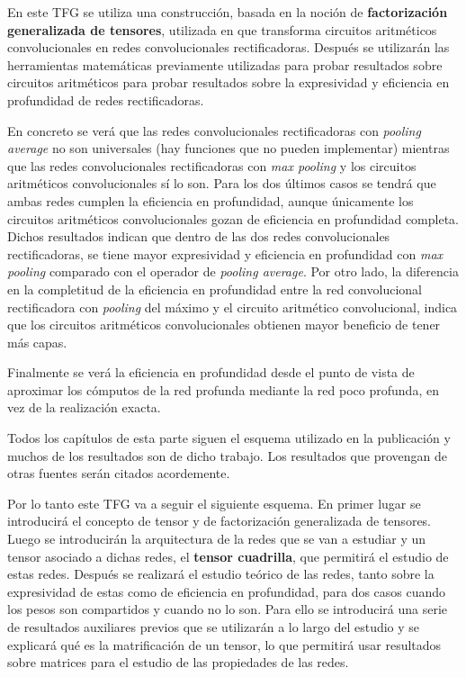 En este TFG se utiliza una construcción, basada en la noción de \textbf{factorización generalizada de tensores}, utilizada en \cite{DBLP:journals/corr/CohenSS15a} que transforma circuitos aritméticos convolucionales en redes convolucionales rectificadoras. Después se utilizarán las herramientas matemáticas previamente utilizadas para probar resultados sobre circuitos aritméticos para probar resultados sobre la expresividad y eficiencia en profundidad de redes rectificadoras. 

En concreto se verá que las redes convolucionales rectificadoras con \textit{pooling average} no son universales (hay funciones que no pueden implementar) mientras que las redes convolucionales rectificadoras con \textit{max pooling} y los circuitos aritméticos convolucionales sí lo son. Para los dos últimos casos se tendrá que ambas redes cumplen la eficiencia en profundidad, aunque únicamente los circuitos aritméticos convolucionales gozan de eficiencia en profundidad completa. Dichos resultados indican que dentro de las dos redes convolucionales rectificadoras, se tiene mayor expresividad y eficiencia en profundidad con \textit{max pooling} comparado con el operador de \textit{pooling average}. Por otro lado, la diferencia en la completitud de la eficiencia en profundidad entre la red convolucional rectificadora con \textit{pooling} del máximo y el circuito aritmético convolucional, indica que los circuitos aritméticos convolucionales obtienen mayor beneficio de tener más capas. 

Finalmente se verá la eficiencia en profundidad desde el punto de vista de aproximar los cómputos de la red profunda mediante la red poco profunda, en vez de la realización exacta.

Todos los capítulos de esta parte siguen el esquema utilizado en la publicación \cite{DBLP:journals/corr/CohenS16} y muchos de los resultados son de dicho trabajo. Los resultados que provengan de otras fuentes serán citados acordemente.

Por lo tanto este TFG va a seguir el siguiente esquema. En primer lugar se introducirá el concepto de tensor y de factorización generalizada de tensores. Luego se introducirán la arquitectura de la redes que se van a estudiar y un tensor asociado a dichas redes, el \textbf{tensor cuadrilla}, que permitirá el estudio de estas redes. Después se realizará el estudio teórico de las redes, tanto sobre la expresividad de estas como de eficiencia en profundidad, para dos casos cuando los pesos son compartidos y cuando no lo son. Para ello se introducirá una serie de resultados auxiliares previos que se utilizarán a lo largo del estudio y se explicará qué es la matrificación de un tensor, lo que permitirá usar resultados sobre matrices para el estudio de las propiedades de las redes. 
\newpage 

